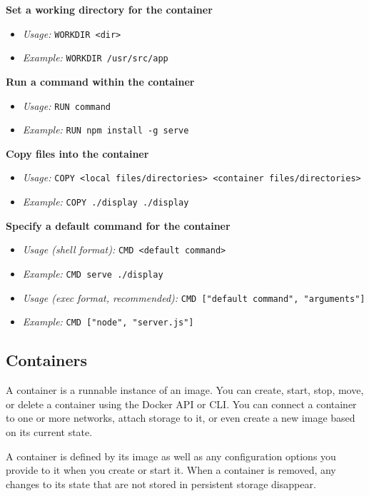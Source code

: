 \documentclass{article}
\begin{document}
\textbf{Set a working directory for the container}

\begin{itemize}
  \item \textit{Usage:} \texttt{WORKDIR <dir>}
  \item \textit{Example:} \texttt{WORKDIR /usr/src/app}
\end{itemize}

\textbf{Run a command within the container}

\begin{itemize}
  \item \textit{Usage:} \texttt{RUN command}
  \item \textit{Example:} \texttt{RUN npm install -g serve}
\end{itemize}

\textbf{Copy files into the container}

\begin{itemize}
  \item \textit{Usage:} \texttt{COPY <local files/directories> <container files/directories>}
  \item \textit{Example:} \texttt{COPY ./display ./display}
\end{itemize}

\textbf{Specify a default command for the container}

\begin{itemize}
  \item \textit{Usage (shell format):} \texttt{CMD <default command>}
  \item \textit{Example:} \texttt{CMD serve ./display}
  \item \textit{Usage (exec format, recommended):} \texttt{CMD ["default command", "arguments"]}
  \item \textit{Example:} \texttt{CMD ["node", "server.js"]}
\end{itemize}

	\subsection{Containers}
	
A container is a runnable instance of an image. You can create, start, stop, move, or delete a container using the Docker API or CLI. You can connect a container to one or more networks, attach storage to it, or even create a new image based on its current state.

A container is defined by its image as well as any configuration options you provide to it when you create or start it. When a container is removed, any changes to its state that are not stored in persistent storage disappear.
\end{document}
